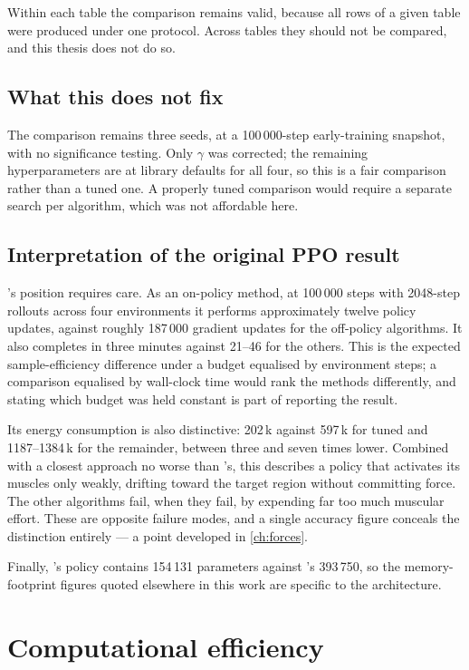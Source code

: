 Within each table the comparison remains valid, because all rows of a given table
were produced under one protocol. Across tables they should not be compared, and
this thesis does not do so.

\subsection{What this does not fix}

The comparison remains three seeds, at a 100\,000-step early-training snapshot,
with no significance testing. Only $\gamma$ was corrected; the remaining
hyperparameters are at library defaults for all four, so this is a fair
comparison rather than a tuned one. A properly tuned comparison would require a
separate search per algorithm, which was not affordable here.

\subsection{Interpretation of the original PPO result}

\PPO's position requires care. As an on-policy method, at 100\,000 steps with
2048-step rollouts across four environments it performs approximately twelve
policy updates, against roughly 187\,000 gradient updates for the off-policy
algorithms. It also completes in three minutes against 21--46 for the others.
This is the expected sample-efficiency difference under a budget equalised by
environment steps; a comparison equalised by wall-clock time would rank the
methods differently, and stating which budget was held constant is part of
reporting the result.

Its energy consumption is also distinctive: 202\,k against 597\,k for tuned \SAC
and 1187--1384\,k for the remainder, between three and seven times lower.
Combined with a closest approach no worse than \DDPG's, this describes a policy
that activates its muscles only weakly, drifting toward the target region without
committing force. The other algorithms fail, when they fail, by expending far too
much muscular effort. These are opposite failure modes, and a single accuracy
figure conceals the distinction entirely --- a point developed in
\cref{ch:forces}.

Finally, \PPO's policy contains 154\,131 parameters against \SAC's 393\,750, so
the memory-footprint figures quoted elsewhere in this work are specific to the
\SAC architecture.

\section{Computational efficiency}
\label{sec:compute_efficiency}

